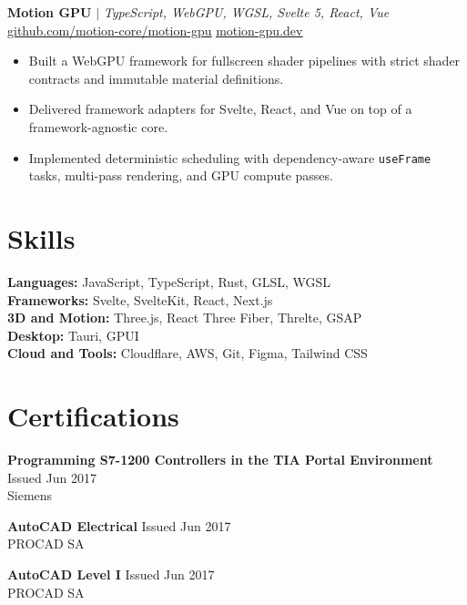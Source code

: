 \documentclass[10pt,a4paper]{article}
\let\oldhref\href
\renewcommand{\href}[2]{\oldhref{#1}{\uline{#2}}}
\begin{document}
\textbf{Motion GPU} $|$ \textit{TypeScript, WebGPU, WGSL, Svelte 5, React, Vue} \hfill\\
\href{https://github.com/motion-core/motion-gpu}{github.com/motion-core/motion-gpu} \textbar{} \href{https://www.motion-gpu.dev/}{motion-gpu.dev}
\begin{itemize}
  \item Built a WebGPU framework for fullscreen shader pipelines with strict shader contracts and immutable material definitions.
  \item Delivered framework adapters for Svelte, React, and Vue on top of a framework-agnostic core.
  \item Implemented deterministic scheduling with dependency-aware \texttt{useFrame} tasks, multi-pass rendering, and GPU compute passes.
\end{itemize}

\section{Skills}

\textbf{Languages:} JavaScript, TypeScript, Rust, GLSL, WGSL\\
\textbf{Frameworks:} Svelte, SvelteKit, React, Next.js\\
\textbf{3D and Motion:} Three.js, React Three Fiber, Threlte, GSAP\\
\textbf{Desktop:} Tauri, GPUI\\
\textbf{Cloud and Tools:} Cloudflare, AWS, Git, Figma, Tailwind CSS

\section{Certifications}

\textbf{Programming S7-1200 Controllers in the TIA Portal Environment} \hfill Issued Jun 2017\\
Siemens

\textbf{AutoCAD Electrical} \hfill Issued Jun 2017\\
PROCAD SA

\textbf{AutoCAD Level I} \hfill Issued Jun 2017\\
PROCAD SA
\end{document}

